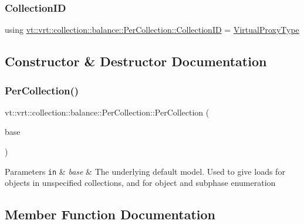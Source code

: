 \subsubsection{\texorpdfstring{Collection\+ID}{CollectionID}}
{\footnotesize\ttfamily using \hyperlink{structvt_1_1vrt_1_1collection_1_1balance_1_1_per_collection_ade08a6857f727a0a9d1ef63b25fc5b71}{vt\+::vrt\+::collection\+::balance\+::\+Per\+Collection\+::\+Collection\+ID} =  \hyperlink{namespacevt_a1b417dd5d684f045bb58a0ede70045ac}{Virtual\+Proxy\+Type}}



\subsection{Constructor \& Destructor Documentation}
\mbox{\label{structvt_1_1vrt_1_1collection_1_1balance_1_1_per_collection_aa149a252fec1619bd947e53e3a66b854}} 
\subsubsection{\texorpdfstring{Per\+Collection()}{PerCollection()}}
{\footnotesize\ttfamily vt\+::vrt\+::collection\+::balance\+::\+Per\+Collection\+::\+Per\+Collection (\begin{DoxyParamCaption}\item[{std\+::shared\+\_\+ptr$<$ \hyperlink{structvt_1_1vrt_1_1collection_1_1balance_1_1_load_model}{Load\+Model} $>$}]{base }\end{DoxyParamCaption})\hspace{0.3cm}{\ttfamily [explicit]}}


\begin{DoxyParams}[1]{Parameters}
\mbox{\tt in}  & {\em base} & The underlying default model. Used to give loads for objects in unspecified collections, and for object and subphase enumeration \\
\hline
\end{DoxyParams}


\subsection{Member Function Documentation}
\mbox{\label{structvt_1_1vrt_1_1collection_1_1balance_1_1_per_collection_a79ecd769664dcaabe413a5d77033b81b}} 
